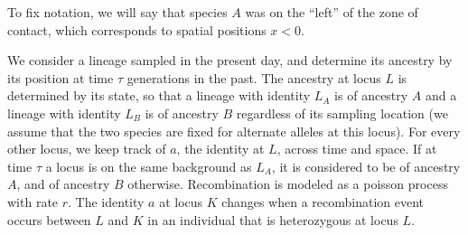\documentclass[12pt]{article}
\begin{document}
To fix notation, we will say that species $A$ was on the ``left'' of the zone of contact,
which corresponds to spatial positions $x<0$.

We consider a lineage sampled in the present day, and determine its ancestry by its position at time $\tau$ generations in the past. The ancestry at locus $L$ is determined by its state, so that a lineage with identity $L_A$ is of ancestry $A$ and a lineage with identity $L_B$ is of ancestry $B$ regardless of its sampling location (we assume that the two species are fixed for alternate alleles at this locus). For every other locus, we keep track of $a$, the identity at $L$, across time and space. If at time $\tau$ a locus is on the same background as $L_A$, it is considered to be of ancestry $A$, and of ancestry $B$ otherwise. Recombination is modeled as a poisson process with rate $r$. The identity $a$ at locus $K$ changes when a recombination event occurs between $L$ and $K$ in an individual that is heterozygous at locus $L$. 
\end{document}
